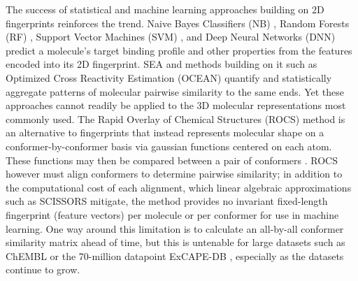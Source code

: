 \documentclass[../../main.tex]{subfiles}
\begin{document}
\begin{refsection}
	The success of statistical and machine learning approaches building on 2D fingerprints reinforces the trend.
	Naive Bayes Classifiers (NB) \supercite{zhang_2004,chen_2007,bender_2004}, Random Forests (RF) \supercite{breiman_2001,svetnik_2003}, Support Vector Machines (SVM) \supercite{chen_2007,cortes_1995,franke_2005}, and Deep Neural Networks (DNN) \supercite{dahl_website_2014,ramsundar_2015,kearnes_2016,baskin_2016,unterthiner_2014} predict a molecule's target binding profile and other properties from the features encoded into its 2D fingerprint.
	SEA and methods building on it such as Optimized Cross Reactivity Estimation (OCEAN) \supercite{czodrowski_2016} quantify and statistically aggregate patterns of molecular pairwise similarity to the same ends.
	Yet these approaches cannot readily be applied to the 3D molecular representations most commonly used.
	The Rapid Overlay of Chemical Structures (ROCS) method is an alternative to fingerprints that instead represents molecular shape on a conformer-by-conformer basis via gaussian functions centered on each atom.
	These functions may then be compared between a pair of conformers \supercite{hawkins_2007,rush_2005}.
	ROCS however must align conformers to determine pairwise similarity; in addition to the computational cost of each alignment, which linear algebraic approximations such as SCISSORS \supercite{haque_2010} mitigate, the method provides no invariant fixed-length fingerprint (feature vectors) per molecule or per conformer for use in machine learning.
	One way around this limitation is to calculate an all-by-all conformer similarity matrix ahead of time, but this is untenable for large datasets such as ChEMBL \supercite{bento_2014} or the 70-million datapoint ExCAPE-DB  \supercite{sun_2017}, especially as the datasets continue to grow.


\end{refsection}
\end{document}
